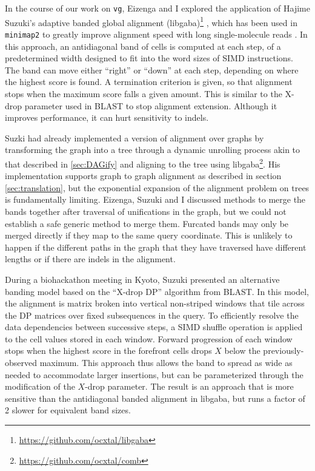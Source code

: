 In the course of our work on {\tt vg}, Eizenga and I explored the application of Hajime Suzuki's adaptive banded global alignment (libgaba)\footnote{\url{https://github.com/ocxtal/libgaba}} \cite{suzuki2017acceleration}, which has been used in {\tt minimap2} to greatly improve alignment speed with long single-molecule reads \cite{li2018minimap2}.
In this approach, an antidiagonal band of cells is computed at each step, of a predetermined width designed to fit into the word sizes of SIMD instructions.
The band can move either ``right'' or ``down'' at each step, depending on where the highest score is found.
A termination criterion is given, so that alignment stops when the maximum score falls a given amount.
This is similar to the X-drop parameter used in BLAST to stop alignment extension.
Although it improves performance, it can hurt sensitivity to indels.

Suzki had already implemented a version of alignment over graphs by transforming the graph into a tree through a dynamic unrolling process akin to that described in \ref{sec:DAGify} and aligning to the tree using libgaba\footnote{\url{https://github.com/ocxtal/comb}}.
His implementation supports graph to graph alignment as described in section \ref{sec:translation}, but the exponential expansion of the alignment problem on trees is fundamentally limiting.
Eizenga, Suzuki and I discussed methods to merge the bands together after traversal of unifications in the graph, but we could not establish a safe generic method to merge them.
Furcated bands may only be merged directly if they map to the same query coordinate.
This is unlikely to happen if the different paths in the graph that they have traversed have different lengths or if there are indels in the alignment.

During a biohackathon meeting in Kyoto, Suzuki presented an alternative banding model based on the ``X-drop DP'' algorithm from BLAST.
In this model, the alignment is matrix broken into vertical non-striped windows that tile across the DP matrices over fixed subsequences in the query.
To efficiently resolve the data dependencies between successive steps, a SIMD shuffle operation is applied to the cell values stored in each window.
Forward progression of each window stops when the highest score in the forefront cells drops $X$ below the previously-observed maximum.
This approach thus allows the band to spread as wide as needed to accommodate larger insertions, but can be parameterized through the modification of the $X$-drop parameter.
The result is an approach that is more sensitive than the antidiagonal banded alignment in libgaba, but runs a factor of 2 slower for equivalent band sizes.

